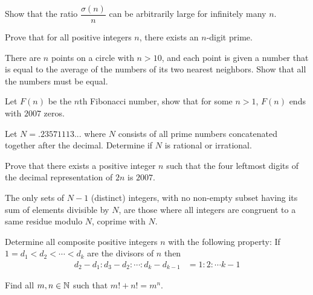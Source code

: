 \documentclass[problems.tex]{subfile}
\begin{document}
	\begin{problem}
		Show that the ratio $\dfrac{\sigma(n)}{n}$ can be arbitrarily large for infinitely many $n$.
	\end{problem}

	\begin{problem}
		Prove that for all positive integers $n$, there exists an $n$-digit prime.
	\end{problem}
	
	\begin{problem}
		There are $n$ points on a circle with $n>10$, and each point is given a number that is equal to the average of the numbers of its two nearest neighbors. Show that all the numbers must be equal.
	\end{problem}
	
	\begin{problem}
		Let $F(n)$ be the $n$th Fibonacci number, show that for some $n>1$, $F(n)$ ends with $2007$ zeros.
	\end{problem}
	
	\begin{problem}
		Let $N=.23571113...$ where $N$ consists of all prime numbers concatenated together after the decimal. Determine if $N$ is rational or irrational.
	\end{problem}
	
	\begin{problem}
		Prove that there exists a positive integer $n$ such that the four leftmost digits of the decimal representation of $2n$ is $2007$.
	\end{problem}
	
	\begin{problem}
		The only sets of $N-1$ (distinct) integers, with no non-empty subset having its sum of elements divisible by $N$, are those where all integers are congruent to a same residue modulo $N$, coprime with $N$.
	\end{problem}
	
	\begin{problem}
		Determine all composite positive integers $n$ with the following property: If $1=d_1<d_2<\cdots<d_k$ are the divisors of $n$ then
			\begin{align*}
				d_2-d_1:d_3-d_2:\cdots:d_k-d_{k-1} & = 1:2:\cdots k-1
			\end{align*}
	\end{problem}
	
	\begin{problem}[Belarus $2009$]
		Find all $m,n\in\mathbb{N}$ such that $m!+n!=m^n$.
	\end{problem}
	
\end{document}
